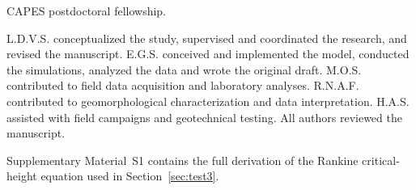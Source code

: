 \documentclass[pdflatex,sn-basic,referee,lineno]{sn-jnl}
\begin{document}
 CAPES postdoctoral fellowship.

 L.D.V.S. conceptualized the study, supervised and coordinated the research, and revised the manuscript. E.G.S. conceived and implemented the model, conducted the simulations, analyzed the data and wrote the original draft. M.O.S. contributed to field data acquisition and laboratory analyses. R.N.A.F. contributed to geomorphological characterization and data interpretation. H.A.S. assisted with field campaigns and geotechnical testing. All authors reviewed the manuscript.

 Supplementary Material~S1 contains the full derivation of the Rankine critical-height equation used in Section~\ref{sec:test3}.


\end{document}
